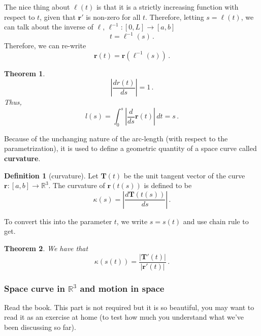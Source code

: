 \documentclass[
]{article}
\newtheorem{theorem}{Theorem}[section]
\theoremstyle{definition}
\newtheorem{definition}{Definition}[section]
\theoremstyle{definition}
\theoremstyle{definition}
\theoremstyle{definition}
\theoremstyle{remark}
\begin{document}
The nice thing about \(\ell(t)\) is that it is a strictly increasing function with respect to \(t\),
given that \(\mathbf{r}'\) is non-zero for all \(t\).
Therefore, letting \(s = \ell(t)\), we can talk about the inverse of \(\ell\), \(\ell^{-1}:[0,L] \to [a,b]\)
\begin{equation*}
    t = \ell^{-1}(s) \,.
\end{equation*}
Therefore, we can re-write
\begin{equation*}
\mathbf{r}(t) = \mathbf{r}(\ell^{-1}(s)) \,.
\end{equation*}

\begin{theorem}
\[\left| \frac{d r(t)}{ds} \right| = 1 \,.\]
Thus,
\[l(s) = \int_0^s \left| \frac{d}{ds} \mathbf{r}(t) \right| \, dt = s \,.\]
\end{theorem}

Because of the unchanging nature of the arc-length (with respect to the
parametrization),
it is used to define a geometric quantity of a space curve called \textbf{curvature}.

\begin{definition}[curvature]
Let \(\mathbf{T}(t)\) be the unit tangent vector of the curve \(\mathbf{r}:[a,b] \to \mathbb{R}^3\).
The curvature of \(\mathbf{r}(t(s))\) is defined to be
\begin{equation*}
    \kappa(s) = \left| \frac{d \mathbf{T}(t(s))}{ds}\right| \,.
\end{equation*}
\end{definition}

To convert this into the parameter \(t\), we write \(s= s(t)\) and use chain rule
to get.

\begin{theorem}
We have that
\begin{equation*}
    \kappa(s(t)) =  \frac{|\mathbf{T}'(t)|}{|\mathbf{r}'(t)|}   \,.
\end{equation*}
\end{theorem}

\hypertarget{space-curve-in-mathbbr3-and-motion-in-space}{%
\subsubsection{\texorpdfstring{Space curve in \(\mathbb{R}^3\) and motion in space}{Space curve in \textbackslash mathbb\{R\}\^{}3 and motion in space}}\label{space-curve-in-mathbbr3-and-motion-in-space}}

Read the book. This part is not required but it is so beautiful, you may want to read it
as an exercise at home (to test how much you understand what we've been discussing so far).
\end{document}
